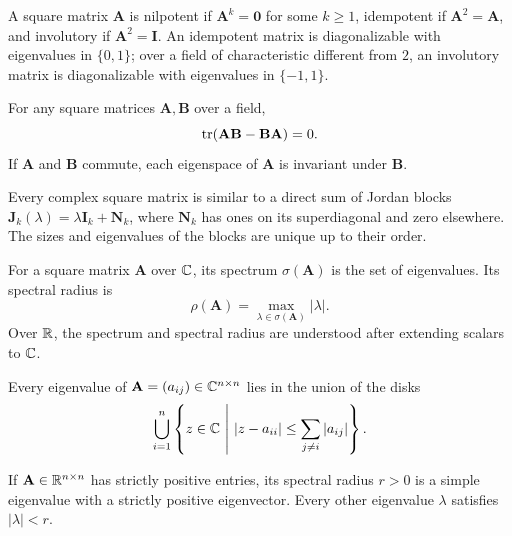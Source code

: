 \begin{definition}
A square matrix $\mathbf{A}$ is nilpotent if $\mathbf{A}^k=\mathbf0$ for some $k\ge1$, idempotent if $\mathbf{A}^2=\mathbf{A}$, and involutory if $\mathbf{A}^2=\mathbf{I}$. An idempotent matrix is diagonalizable with eigenvalues in $\{0,1\}$; over a field of characteristic different from $2$, an involutory matrix is diagonalizable with eigenvalues in $\{-1,1\}$.
\end{definition}
\begin{proposition}
For any square matrices $\mathbf{A},\mathbf{B}$ over a field,
\[
 \operatorname{tr}(\mathbf{A}\mathbf{B}-\mathbf{B}\mathbf{A})=0.
\]
If $\mathbf{A}$ and $\mathbf{B}$ commute, each eigenspace of $\mathbf{A}$ is invariant under $\mathbf{B}$.
\end{proposition}

\begin{theorem}
Every complex square matrix is similar to a direct sum of Jordan blocks $\mathbf{J}_k(\lambda)=\lambda\mathbf{I}_k+\mathbf{N}_k$, where $\mathbf{N}_k$ has ones on its superdiagonal and zero elsewhere. The sizes and eigenvalues of the blocks are unique up to their order.
\end{theorem}

\begin{definition}
For a square matrix $\mathbf{A}$ over $\mathbb{C}$, its spectrum $\sigma(\mathbf{A})$ is the set of eigenvalues. Its spectral radius is
\[
 \rho(\mathbf{A})=\max_{\lambda\in\sigma(\mathbf{A})}|\lambda|.
\]
Over $\mathbb{R}$, the spectrum and spectral radius are understood after extending scalars to $\mathbb{C}$.
\end{definition}

\begin{theorem}
Every eigenvalue of $\mathbf{A}=(a_{ij})\in\mathbb{C}^{n\times n}$ lies in the union of the disks
\[
 \bigcup_{i=1}^n\left\{z\in\C\ \middle|\ |z-a_{ii}|\le\sum_{j\ne i}|a_{ij}|\right\}.
\]
\end{theorem}

\begin{theorem}
If $\mathbf{A}\in\mathbb{R}^{n\times n}$ has strictly positive entries, its spectral radius $r>0$ is a simple eigenvalue with a strictly positive eigenvector. Every other eigenvalue $\lambda$ satisfies $|\lambda|<r$.
\end{theorem}

